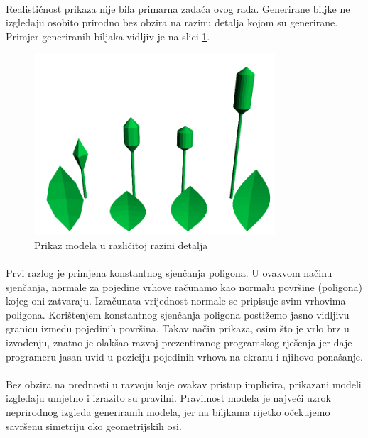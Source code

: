 \documentclass[times, utf8, diplomski]{fer}
\begin{document}
\paragraph{}
Realističnost prikaza nije bila primarna zadaća ovog rada. Generirane biljke ne 
izgledaju osobito prirodno bez obzira na razinu detalja kojom su generirane. Primjer 
generiranih biljaka vidljiv je na slici \ref{fig:51-1}.
\begin{figure}[h]
	\centering
	\includegraphics[width=0.8\textwidth]{img/51-1}
	\caption{Prikaz modela u različitoj razini detalja}
	\label{fig:51-1}
\end{figure}
\paragraph{}
Prvi razlog je primjena konstantnog sjenčanja poligona. U ovakvom načinu 
sjenčanja, normale za pojedine vrhove računamo kao normalu površine (poligona)
kojeg oni zatvaraju. Izračunata vrijednost normale se pripisuje svim vrhovima
poligona. Korištenjem konstantnog sjenčanja poligona postižemo jasno 
vidljivu granicu između pojedinih površina. Takav način prikaza, osim što je
vrlo brz u izvođenju, znatno je olakšao razvoj prezentiranog programskog 
rješenja jer daje programeru jasan uvid u poziciju pojedinih vrhova na ekranu
i njihovo ponašanje. 

\paragraph{}
Bez obzira na prednosti u razvoju koje ovakav pristup implicira, prikazani 
modeli izgledaju umjetno i izrazito su pravilni. Pravilnost modela je najveći
uzrok neprirodnog izgleda generiranih modela, jer na biljkama rijetko očekujemo
savršenu simetriju oko geometrijskih osi.
\end{document}
